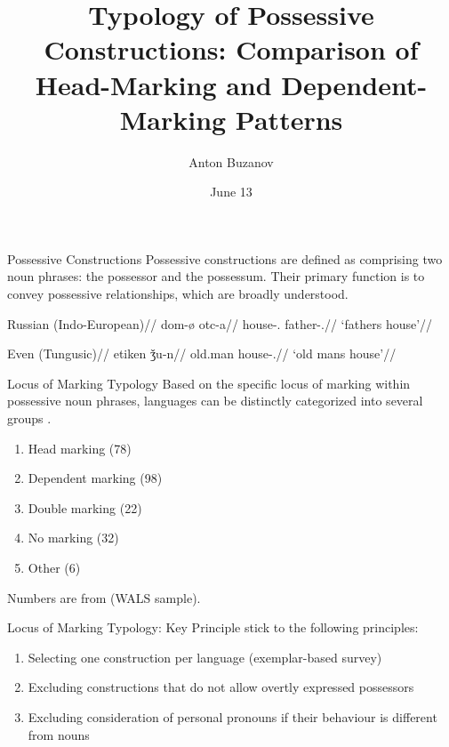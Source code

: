 \documentclass[12pt,aspectratio=169,t]{beamer}
\title{\textbf{Typology of Possessive Constructions: Comparison of Head-Marking and Dependent-Marking Patterns}}
\author{Anton Buzanov}
\institute{MA Thesis. Linguistic Theory and Language Description}
\date{June 13}
\renewcommand{\'}{\textquotesingle}
\begin{document}
\begin{frame}[plain]
\maketitle
\end{frame}


\begin{frame}{Possessive Constructions}
    Possessive constructions are defined as comprising two noun phrases: the possessor and the possessum. Their primary function is to convey possessive relationships, which are broadly understood.
    
    \begin{multicols}{2}
    	\ex
    	\begingl
    	\glpreamble Russian (Indo-European)//
    	\gla dom-\o{} otc-a//
    	\glb house-\Nom.\Sg{} father-\Gen.\Sg{}//
    	\glft `father\'s house'//
    	\endgl 
    	\xe
    	
    	\ex
    	\begingl
    	\glpreamble Even (Tungusic)//
    	\gla etiken  ǯu-n//
    	\glb old.man house-\Poss.\Tsg{}//
    	\glft `old man\'s house'//
    	\endgl 
    	\xe
    \end{multicols}
    
\end{frame}


\begin{frame}{Locus of Marking Typology}
	Based on the specific locus of marking within possessive noun phrases, languages can be distinctly categorized into several groups \citep{nichols_locus_2013,van2016locus,van2016grammaticalization}.
	
	\begin{enumerate}
		\item Head marking (78)
		\item Dependent marking (98)
		\item Double marking (22)
		\item No marking (32)
		\item Other (6)
	\end{enumerate}
	
	\hfill \small Numbers are from \cite{nichols_locus_2013} (WALS sample).
\end{frame}

\begin{frame}{Locus of Marking Typology: Key Principle}
	\cite{nichols_locus_2013} stick to the following principles:
	
	\begin{enumerate}
		\item Selecting one construction per language (exemplar-based survey)
		\item Excluding constructions that do not allow overtly expressed possessors
		\item Excluding consideration of personal pronouns if their behaviour is different from nouns
	\end{enumerate}
\end{frame}
\end{document}
